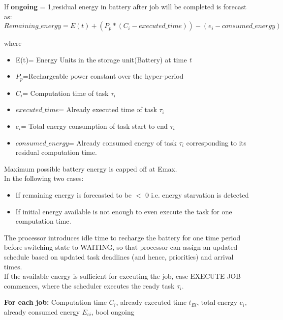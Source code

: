 \documentclass[12pt,hidelinks]{article}
\begin{document}
{If \textbf{ongoing} = 1,residual energy in battery after job will be completed  is forecast as:
\begin{equation}
    Remaining\_energy = E(t) + (P_p * (C_i - executed\_time)) - (e_i - consumed\_energy)
\end{equation}

where
\begin{itemize}
    \item E(t)= Energy Units in the storage unit(Battery) at time \textit{t}
    \item $P_p$=Rechargeable power constant over the hyper-period
    \item $C_i$= Computation time of task $\tau_i$
    \item $executed\_time$= Already executed time of task $\tau_i$
    \item $e_i$= Total energy consumption of task start to end $\tau_i$
    \item $consumed\_energy$= Already consumed energy of task $\tau_i$ corresponding to its residual computation time.
\end{itemize}

Maximum possible battery energy is capped off at Emax.\\

In the following two cases:\\
\begin{itemize}
    \item If remaining energy is forecasted to be $<$ 0 i.e. energy starvation is detected
    \item If initial energy available is not enough to even execute the task for one computation time.\\
    \end{itemize}
    
The processor introduces idle time to recharge the battery for one time period before switching state to WAITING, so that processor can assign an updated schedule based on updated task deadlines (and hence, priorities) and arrival times.\\

If the available energy is sufficient for executing the job, case EXECUTE JOB commences, where the scheduler executes the ready task $\tau_i$.\\

\begin{algorithm}[H]
\SetAlgoLined
\DontPrintSemicolon
  \textbf{For each job: }{Computation time $C_i$, already executed time $t_{Ei}$, total energy $e_i$, already consumed energy $E_{ci}$, bool ongoing}
  

\end{algorithm}}
\end{document}
